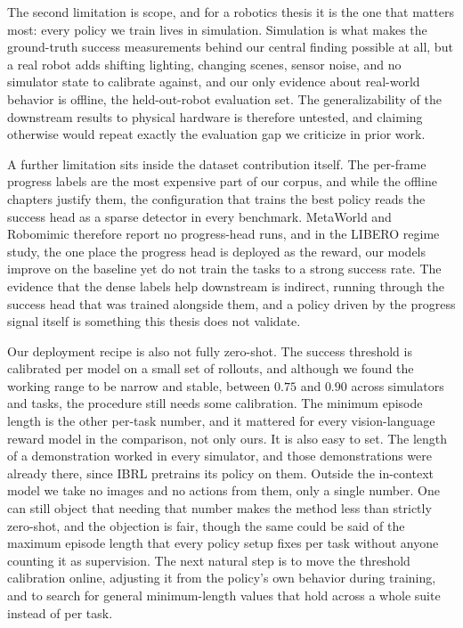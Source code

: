 The second limitation is scope, and for a robotics thesis it is the one that matters most: every policy we train lives in simulation. Simulation is what makes the ground-truth success measurements behind our central finding possible at all, but a real robot adds shifting lighting, changing scenes, sensor noise, and no simulator state to calibrate against, and our only evidence about real-world behavior is offline, the held-out-robot evaluation set. The generalizability of the downstream results to physical hardware is therefore untested, and claiming otherwise would repeat exactly the evaluation gap we criticize in prior work.

A further limitation sits inside the dataset contribution itself. The per-frame progress labels are the most expensive part of our corpus, and while the offline chapters justify them, the configuration that trains the best policy reads the success head as a sparse detector in every benchmark. MetaWorld and Robomimic therefore report no progress-head runs, and in the LIBERO regime study, the one place the progress head is deployed as the reward, our models improve on the baseline yet do not train the tasks to a strong success rate. The evidence that the dense labels help downstream is indirect, running through the success head that was trained alongside them, and a policy driven by the progress signal itself is something this thesis does not validate.

Our deployment recipe is also not fully zero-shot. The success threshold is calibrated per model on a small set of rollouts, and although we found the working range to be narrow and stable, between $0.75$ and $0.90$ across simulators and tasks, the procedure still needs some calibration. The minimum episode length is the other per-task number, and it mattered for every vision-language reward model in the comparison, not only ours. It is also easy to set. The length of a demonstration worked in every simulator, and those demonstrations were already there, since IBRL pretrains its policy on them. Outside the in-context model we take no images and no actions from them, only a single number. One can still object that needing that number makes the method less than strictly zero-shot, and the objection is fair, though the same could be said of the maximum episode length that every policy setup fixes per task without anyone counting it as supervision. The next natural step is to move the threshold calibration online, adjusting it from the policy's own behavior during training, and to search for general minimum-length values that hold across a whole suite instead of per task.

